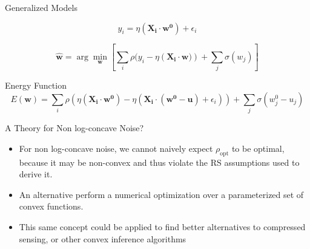 \documentclass[pdf]{beamer}
\begin{document}
\begin{frame}{Generalized Models}

\begin{equation*}
y_i = \eta(\mathbf{X_i} \cdot \mathbf{w^0}) + \epsilon_i
\end{equation*}


\begin{equation*}
\mathbf{\hat{w}} = \arg \min_{\mathbf{w}}{\left[\sum_i{\rho(y_i - \eta\left(\mathbf{X_i}\cdot \mathbf{w})\right)} + \sum_j{\sigma(w_j)}\right]}
\end{equation*}

\vspace{.2in}

\begin{block}{Energy Function}
\begin{equation*}
E(\mathbf{w}) = \sum_i{\rho \left( \eta\left(\mathbf{X_i} \cdot \mathbf{w^0}\right)- \eta\left(\mathbf{X_i} \cdot (\mathbf{w^0}-\mathbf{u}) + \epsilon_i \right)\right)} + \sum_j{\sigma(w_j^0-u_j)}
\end{equation*}
\end{block}
\end{frame}



\begin{frame}{A Theory for Non log-concave Noise?}


\begin{itemize}

\item For non log-concave noise, we cannot naively expect $\rho_{\text{opt}}$ to be optimal, because it may be non-convex and thus violate the RS assumptions used to derive it.

\vspace{.2in}

\item An alternative perform a numerical optimization over a parameterized set of convex functions.


\vspace{.2in}

\item This same concept could be applied to find better alternatives to compressed sensing, or other convex inference algorithms


\end{itemize}

\end{frame}
\end{document}
